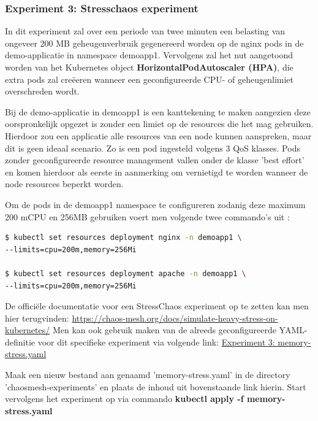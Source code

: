 \subsubsection{Experiment 3: Stresschaos experiment}

In dit experiment zal over een periode van twee minuten een belasting van ongeveer 200 MB geheugenverbruik gegenereerd worden op de nginx pods in de demo-applicatie in namespace demoapp1. Vervolgens zal het nut aangetoond worden van het Kubernetes object {\bf HorizontalPodAutoscaler (HPA)}, die extra pods zal creëeren wanneer een geconfigureerde CPU- of geheugenlimiet overschreden wordt.

Bij de demo-applicatie in demoapp1 is een kanttekening te maken aangezien deze oorspronkelijk opgezet is zonder een limiet op de resources die het mag gebruiken. Hierdoor zou een applicatie alle resources van een node kunnen aanspreken, maar dit is geen ideaal scenario. Zo is een pod ingesteld volgens 3 QoS klasses. Pods zonder geconfigureerde resource management vallen onder de klasse 'best effort' en komen hierdoor als eerste in aanmerking om vernietigd te worden wanneer de node resources beperkt worden. \autocite{Tatiyana2020}

Om de pods in de demoapp1 namespace te configureren zodanig deze maximum 200 mCPU en 256MB gebruiken voert men volgende twee commando's uit \autocite{Kubernetes2022c}: 
\begin{lstlisting}[language=bash]
$ kubectl set resources deployment nginx -n demoapp1 \
--limits=cpu=200m,memory=256Mi

$ kubectl set resources deployment apache -n demoapp1 \
--limits=cpu=200m,memory=256Mi
\end{lstlisting}

De officiële documentatie voor een StressChaos experiment op te zetten kan men hier terugvinden: \url{https://chaos-mesh.org/docs/simulate-heavy-stress-on-kubernetes/}
\newline Men kan ook gebruik maken van de alreeds geconfigureerde YAML-definitie voor dit specifieke experiment via volgende link: \href{https://github.com/KenBruggeman/BP\textunderscore 21-22/blob/master/bachelorproef/docs/chaosmesh%20experimenten/memory-stress.yaml}{Experiment 3: memory-stress.yaml}

Maak een nieuw bestand aan genaamd 'memory-stress.yaml' in de directory 'chaosmesh-experiments' en plaats de inhoud uit bovenstaande link hierin. Start vervolgens het experiment op via commando {\bf kubectl apply -f memory-stress.yaml}

